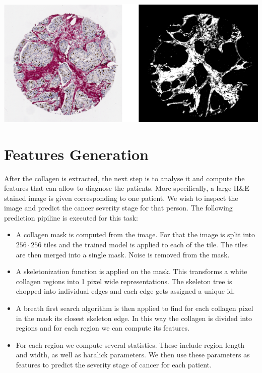 \documentclass{article}
\begin{document}
\includegraphics[width=\textwidth]{images/test.png}

\section{Features Generation}

After the collagen is extracted, the next step is to analyse it and compute
the features that can allow to diagnose the patients. More specifically, a 
large H\&E stained image is given corresponding to one patient. We wish to
inspect the image and predict the cancer severity stage for that person. The
following prediction pipiline is executed for this task:

\begin{itemize}
    
\item A collagen mask is computed from the image. For that the image is split
      into $256 \cdot 256$ tiles and the trained model is applied to each
      of the tile. The tiles are then merged into a single mask. Noise is
      removed from the mask.

\item A skeletonization function is applied on the mask. This transforms
      a white collagen regions into 1 pixel wide representations. The skeleton
      tree is chopped into individual edges and each edge gets assigned a
      unique id.

\item A breath first search algorithm is then applied to find for each collagen
      pixel in the mask its closest skeleton edge. In this way the collagen
      is divided into regions and for each region we can compute its
      features.

\item For each region we compute several statistics. These include region
      length and width, as well as haralick parameters. We then use these
      parameters as features to predict the severity stage of cancer for
      each patient.

\end{itemize}
\end{document}
